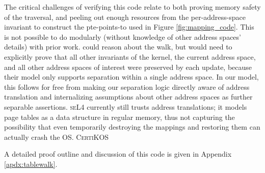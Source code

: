 The critical challenges of verifying this code relate to both proving memory safety of the traversal, and peeling out enough resources from the per-address-space
invariant to construct the pte-points-to used in Figure \ref{fig:mapping_code}.
This is not possible to do modularly (without knowledge of other address spaces' details) with prior work.  \citet{kolanski08vstte} could reason about the walk, but would need to explicitly prove that all other invariants
of the kernel, the current address space, and all other address spaces of interest were preserved by each update, because their model
only supports separation within a single address space. In our model, this follows for free from making
our separation logic directly aware of address translation and internalizing assumptions about other address spaces as further separable assertions.
\textsc{seL4} currently still trusts address translations; it models page tables as a data structure in regular memory, thus not capturing the possibility that even
temporarily destroying the mappings and restoring them can actually crash the OS. \textsc{CertiKOS} 

A detailed proof outline and discussion of this code is given in Appendix \ref{apdx:tablewalk}.


